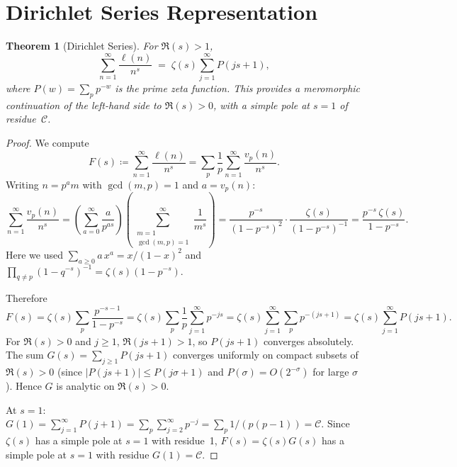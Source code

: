 \documentclass[11pt,a4paper]{amsart}
\theoremstyle{plain}
\newtheorem{theorem}{Theorem}[section]
\theoremstyle{definition}
\begin{document}
\section{Dirichlet Series Representation}

\begin{theorem}[Dirichlet Series]\label{thm:dirichlet}
For $\Re(s) > 1$,
\begin{equation}\label{eq:dirichlet}
\sum_{n=1}^{\infty} \frac{\ell(n)}{n^s}
\;=\; \zeta(s) \sum_{j=1}^{\infty} P(js + 1),
\end{equation}
where $P(w) = \sum_p p^{-w}$ is the prime zeta function.  This provides a 
meromorphic continuation of the left-hand side to $\Re(s) > 0$, with a 
simple pole at $s = 1$ of residue~$\mathcal{C}$.
\end{theorem}

\begin{proof}
We compute
\[
F(s) \coloneqq \sum_{n=1}^{\infty} \frac{\ell(n)}{n^s}
= \sum_{p} \frac{1}{p} \sum_{n=1}^{\infty} \frac{v_p(n)}{n^s}.
\]
Writing $n = p^a m$ with $\gcd(m,p) = 1$ and $a = v_p(n)$:
\begin{equation}\label{eq:vpsum}
\sum_{n=1}^{\infty} \frac{v_p(n)}{n^s}
= \left(\sum_{a=0}^{\infty} \frac{a}{p^{as}}\right)\!\!
\left(\sum_{\substack{m=1 \\ \gcd(m,p)=1}}^{\infty} \frac{1}{m^s}\right)
= \frac{p^{-s}}{(1 - p^{-s})^2} \cdot \frac{\zeta(s)}{(1 - p^{-s})^{-1}}
= \frac{p^{-s}\,\zeta(s)}{1 - p^{-s}}.
\end{equation}
Here we used $\sum_{a \ge 0} a\,x^a = x/(1-x)^2$ and $\prod_{q \neq p}(1 - q^{-s})^{-1} = \zeta(s)(1 - p^{-s})$.

Therefore
\[
F(s) = \zeta(s) \sum_{p} \frac{p^{-s-1}}{1 - p^{-s}}
= \zeta(s) \sum_{p} \frac{1}{p} \sum_{j=1}^{\infty} p^{-js}
= \zeta(s) \sum_{j=1}^{\infty} \sum_{p} p^{-(js+1)}
= \zeta(s) \sum_{j=1}^{\infty} P(js + 1).
\]
For $\Re(s) > 0$ and $j \ge 1$, $\Re(js + 1) > 1$, so $P(js+1)$ converges absolutely.  The sum $G(s) = \sum_{j \ge 1} P(js+1)$ converges uniformly on compact subsets of $\Re(s) > 0$ (since $|P(js+1)| \le P(j\sigma + 1)$ and $P(\sigma) = O(2^{-\sigma})$ for large $\sigma$).  Hence $G$ is analytic on $\Re(s) > 0$.

At $s = 1$: $G(1) = \sum_{j=1}^{\infty} P(j+1) = \sum_p \sum_{j=2}^{\infty} p^{-j} = \sum_p 1/(p(p-1)) = \mathcal{C}$.  Since $\zeta(s)$ has a simple pole at $s = 1$ with residue~1, $F(s) = \zeta(s) G(s)$ has a simple pole at $s=1$ with residue $G(1) = \mathcal{C}$.
\end{proof}
\end{document}
